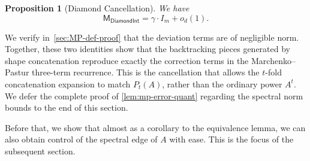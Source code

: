 \documentclass[12pt]{article}
\newtheorem{proposition}[theorem]{Proposition}
\newcommand{\gam}{\gamma}
\newcommand{\cm}{\mathsf{M} }
\newcommand{\todo}[1]{\textcolor{red}{(#1)}}
\begin{document}
\begin{proposition}[Diamond Cancellation] \label{prop:diamond-cancellation}
We have
\[
    \cm_{\mathsf{DiamondInt}}= \gam \cdot I_m+o_d(1).
\]
\end{proposition}

% 

 We verify in~\cref{sec:MP-def-proof} that the deviation terms are of negligible norm. Together, these two identities show that the backtracking pieces generated by
shape concatenation reproduce exactly the correction terms in the
Marchenko--Pastur three-term recurrence. This is the cancellation that allows
the \(t\)-fold concatenation expansion to match \(P_t(A)\), rather than the
ordinary power \(A^t\). We defer the complete proof of \cref{lem:mp-error-quant} regarding the spectral norm bounds to the end of this section.

 Before that, we show that almost as a corollary to the equivalence lemma, we can also obtain control of the spectral edge of $A$ with ease. This is the focus of the subsequent section.

%
\end{document}
